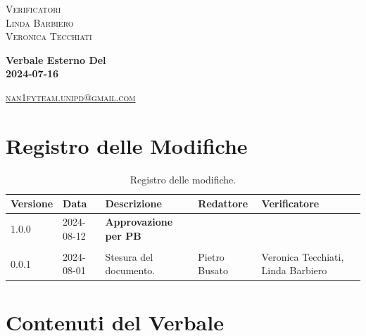\documentclass[8pt]{article}
\begin{document}
\begin{titlepage}
\begin{minipage}[t]{0.47\textwidth}
		{\large{\textsc{Verificatori}}
			\vspace{3mm}
			{\\\large{\textsc{Linda Barbiero}\\}} %
			{\large{\textsc{Veronica Tecchiati}}}
			
		}
		\vspace{4mm}\vspace{4mm}
	\end{minipage}
	\vspace{4cm}
	\begin{center}
		\begin{flushright}
			{\fontsize{30pt}{52pt}\selectfont \textbf{Verbale Esterno Del\\2024-07-16\\}} %
		\end{flushright}
		\vspace{3cm}
	\end{center}
	\vspace{8.5 cm}
	{\small \textsc{\href{mailto: nan1fyteam.unipd@gmail.com}{nan1fyteam.unipd@gmail.com}}}
\end{titlepage}
\pagestyle{mystyle}
\section*{Registro delle Modifiche}
\begin{table}[ht!]	
	\centering
	\begin{tabular}{p{1.2cm} p{2cm} p{5cm} p{3cm} p{3cm}}
		\toprule
		\textbf{Versione}& \textbf{Data} & \textbf{Descrizione} & \textbf{Redattore} & \textbf{Verificatore} \\
		\midrule
		1.0.0 & 2024-08-12 & \textbf{Approvazione per PB} & & \\\\
		0.0.1 & 2024-08-01 & Stesura del documento. & Pietro Busato & Veronica Tecchiati, Linda Barbiero \\
		\bottomrule
	\end{tabular}
	\caption{Registro delle modifiche.}
	\label{table:Registro delle modifiche}
\end{table}
\newpage
\tableofcontents
\clearpage
\newpage
\justifying
\section{Contenuti del Verbale}
\end{document}
